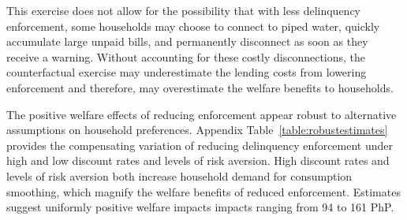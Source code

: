 \documentclass[12pt,table]{article}
\begin{document}
This exercise does not allow for the possibility that with less delinquency enforcement, some households may choose to connect to piped water, quickly accumulate large unpaid bills, and permanently disconnect as soon as they receive a warning.  Without accounting for these costly disconnections, the counterfactual exercise may underestimate the lending costs from lowering enforcement and therefore, may overestimate the welfare benefits to households.

The positive welfare effects of reducing enforcement appear robust to alternative assumptions on household preferences.  Appendix Table~\ref{table:robustestimates} provides the compensating variation of reducing delinquency enforcement under high and low discount rates and levels of risk aversion.  High discount rates and levels of risk aversion both increase household demand for consumption smoothing, which magnify the welfare benefits of reduced enforcement.  Estimates suggest uniformly positive welfare impacts impacts ranging from 94 to 161 PhP.













\end{document}
